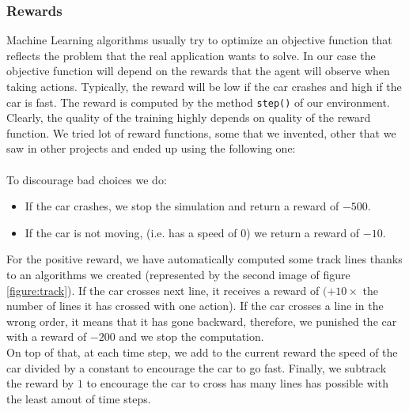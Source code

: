 \documentclass[11pt,a4paper]{article}
\newcounter{fig}
\newcommand{\mlist}[1]{\begin{itemize}[noitemsep,topsep=0pt]#1\end{itemize}}
\begin{document}
			\subsubsection*{Rewards}
Machine Learning algorithms usually try to optimize an objective function that reflects 
the problem that the real application wants to solve. In our case the objective function 
will depend on the rewards that the agent will observe when taking actions. Typically, the reward 
will be low if the car crashes and high if the car is fast.
The reward is computed by the method \texttt{step()} of our environment. 
Clearly, the quality of the training highly depends on quality of the reward function.
We tried lot of reward functions, some that we invented, other that we saw in other projects and ended up using the following one:\\
\\
To discourage bad choices we do:
\mlist{
\item If the car crashes, we stop the simulation and return a reward of $-500$.
\item If the car is not moving, (i.e. has a speed of $0$) we return a reward of $-10$.
}
For the positive reward, we have automatically computed some track lines thanks to an algorithms we created (represented by the second image of figure \ref{figure:track}). 
If the car crosses next line, it receives a reward of $(+10\times$ the number of lines it has crossed with one action). 
If the car crosses a line in the wrong order, it means that it has gone backward, therefore, we punished the car with a reward of $-200$ and we stop the computation.\\
On top of that, at each time step, we add to the current reward the speed of the car divided by a constant to encourage the car to go fast. Finally, we subtrack the reward by $1$ to encourage the car to cross has many lines has possible with the least amout of time steps.
\end{document}
